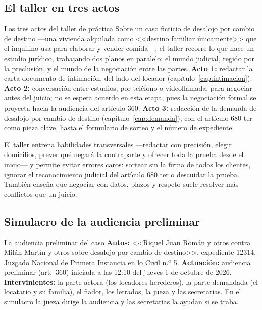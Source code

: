 \documentclass[12pt,oneside]{book}
\begin{document}
\subsection{El taller en tres actos}

\begin{example}{Los tres actos del taller de práctica}
Sobre un caso ficticio de desalojo por cambio de destino ---una vivienda alquilada como <<destino familiar únicamente>> que el inquilino usa para elaborar y vender comida---, el taller recorre lo que hace un estudio jurídico, trabajando dos planos en paralelo: el mundo judicial, regido por la preclusión, y el mundo de la negociación entre las partes. \textbf{Acto 1:} redactar la carta documento de intimación, del lado del locador (capítulo~\ref{cap:intimacion}). \textbf{Acto 2:} conversación entre estudios, por teléfono o videollamada, para negociar antes del juicio; no se espera acuerdo en esta etapa, pues la negociación formal se proyecta hacia la audiencia del artículo 360. \textbf{Acto 3:} redacción de la demanda de desalojo por cambio de destino (capítulo~\ref{cap:demanda}), con el artículo 680 ter como pieza clave, hasta el formulario de sorteo y el número de expediente.
\end{example}

El taller entrena habilidades transversales ---redactar con precisión, elegir domicilios, prever qué negará la contraparte y ofrecer toda la prueba desde el inicio--- y permite evitar errores caros: sortear sin la firma de todos los clientes, ignorar el reconocimiento judicial del artículo 680 ter o descuidar la prueba. También enseña que negociar con datos, plazos y respeto suele resolver más conflictos que un juicio.

\subsection{Simulacro de la audiencia preliminar}

\begin{exercise}{La audiencia preliminar del caso}
\textbf{Autos:} <<Riquel Juan Román y otros contra Milán Martín y otros sobre desalojo por cambio de destino>>, expediente 12314, Juzgado Nacional de Primera Instancia en lo Civil n.º 5. \textbf{Actuación:} audiencia preliminar (art.\ 360) iniciada a las 12:10 del jueves 1 de octubre de 2026. \textbf{Intervinientes:} la parte actora (los locadores herederos), la parte demandada (el locatario y su familia), el fiador, los letrados, la jueza y las secretarías. En el simulacro la jueza dirige la audiencia y las secretarias la ayudan si se traba.
\end{exercise}
\end{document}

